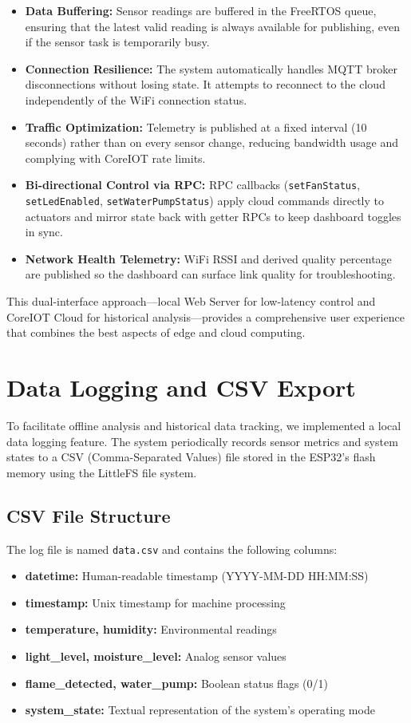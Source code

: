 \begin{itemize}
    \item \textbf{Data Buffering:} Sensor readings are buffered in the FreeRTOS queue, ensuring that the latest valid reading is always available for publishing, even if the sensor task is temporarily busy.
    \item \textbf{Connection Resilience:} The system automatically handles MQTT broker disconnections without losing state. It attempts to reconnect to the cloud independently of the WiFi connection status.
    \item \textbf{Traffic Optimization:} Telemetry is published at a fixed interval (10 seconds) rather than on every sensor change, reducing bandwidth usage and complying with CoreIOT rate limits.
    \item \textbf{Bi-directional Control via RPC:} RPC callbacks (\texttt{setFanStatus}, \texttt{setLedEnabled}, \texttt{setWaterPumpStatus}) apply cloud commands directly to actuators and mirror state back with getter RPCs to keep dashboard toggles in sync.
    \item \textbf{Network Health Telemetry:} WiFi RSSI and derived quality percentage are published so the dashboard can surface link quality for troubleshooting.
\end{itemize}

This dual-interface approach—local Web Server for low-latency control and CoreIOT Cloud for historical analysis—provides a comprehensive user experience that combines the best aspects of edge and cloud computing.

\section{Data Logging and CSV Export}

To facilitate offline analysis and historical data tracking, we implemented a local data logging feature. The system periodically records sensor metrics and system states to a CSV (Comma-Separated Values) file stored in the ESP32's flash memory using the LittleFS file system.

\subsection{CSV File Structure}

The log file is named \texttt{data.csv} and contains the following columns:
\begin{itemize}
    \item \textbf{datetime:} Human-readable timestamp (YYYY-MM-DD HH:MM:SS)
    \item \textbf{timestamp:} Unix timestamp for machine processing
    \item \textbf{temperature, humidity:} Environmental readings
    \item \textbf{light\_level, moisture\_level:} Analog sensor values
    \item \textbf{flame\_detected, water\_pump:} Boolean status flags (0/1)
    \item \textbf{system\_state:} Textual representation of the system's operating mode
\end{itemize}

